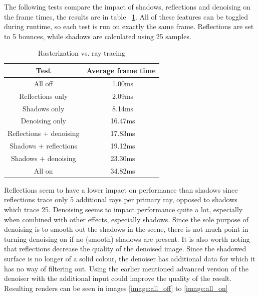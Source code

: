 \documentclass[times, utf8, zavrsni, numeric]{fer}
\begin{document}
The following tests compare the impact of shadows, reflections and denoising on the frame times, the results are in table ~\ref{table:real_test}. All of these features can be toggled during runtime, so each test is run on exactly the same frame.
Reflections are set to 5 bounces, while shadows are calculated using 25 samples.
\begin{table}[H]
\caption{Rasterization vs. ray tracing}
\begin{center}
\begin{tabular}{|c|c|}
\hline
Test & Average frame time \\
\hline
All off & ~1.00ms \\
\hline
Reflections only & ~2.09ms \\
\hline
Shadows only & ~8.14ms \\
\hline
Denoising only & ~16.47ms \\
\hline
Reflections + denoising & ~17.83ms \\
\hline
Shadows + reflections & ~19.12ms \\
\hline
Shadows + denoising & ~23.30ms \\
\hline
All on & ~34.82ms \\
\hline
\end{tabular}
\label{table:real_test}
\end{center}
\end{table}

Reflections seem to have a lower impact on performance than shadows since reflections trace only 5 additional rays per primary ray, opposed to shadows which trace 25. Denoising seems to impact performance quite a lot, especially when combined with other effects, especially shadows. Since the sole purpose of denoising is to smooth out the shadows in the scene, there is not much point in turning denoising on if no (smooth) shadows are present. It is also worth noting that reflections decrease the quality of the denoised image. Since the shadowed surface is no longer of a solid colour, the denoiser has additional data for which it has no way of filtering out. Using the earlier mentioned advanced version of the denoiser with the additional input could improve the quality of the result. Resulting renders can be seen in images \ref{image:all_off} to \ref{image:all_on} 
\end{document}
